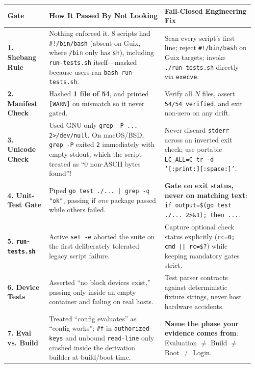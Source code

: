 \documentclass[11pt,oneside]{book}
\begin{document}
\begin{center}
\begin{tabularx}{\textwidth}{lXX}
\toprule
\textbf{Gate} & \textbf{How It Passed By Not Looking} & \textbf{Fail-Closed Engineering Fix} \\
\midrule
\textbf{1. Shebang Rule} & Nothing enforced it. 8 scripts had \texttt{\#!/bin/bash} (absent on Guix, where \texttt{/bin} only has \texttt{sh}), including \texttt{run-tests.sh} itself—masked because users ran \texttt{bash run-tests.sh}. & Scan every script's first line; reject \texttt{\#!/bin/bash} on Guix targets; invoke \texttt{./run-tests.sh} directly via \texttt{execve}. \\
\textbf{2. Manifest Check} & Hashed \textbf{1 file of 54}, and printed \texttt{[WARN]} on mismatch so it never gated. & Verify all $N$ files, assert \texttt{54/54 verified}, and exit non-zero on any drift. \\
\textbf{3. Unicode Check} & Used GNU-only \texttt{grep -P ... 2>/dev/null}. On macOS/BSD, \texttt{grep -P} exited \texttt{2} immediately with empty stdout, which the script treated as ``0 non-ASCII bytes found''! & Never discard \texttt{stderr} across an inverted exit check; use portable \texttt{LC\_ALL=C tr -d '[:print:][:space:]'}. \\
\textbf{4. Unit-Test Gate} & Piped \texttt{go test ./... | grep -q "ok"}, passing if \emph{one} package passed while others failed. & \textbf{Gate on exit status, never on matching text}: \texttt{if output=\$(go test ./... 2>\&1); then ...}. \\
\textbf{5. \texttt{run-tests.sh}} & Active \texttt{set -e} aborted the suite on the first deliberately tolerated legacy script failure. & Capture optional check status explicitly (\texttt{rc=0; cmd || rc=\$?}) while keeping mandatory gates strict. \\
\textbf{6. Device Tests} & Asserted ``no block devices exist,'' passing only inside an empty container and failing on real hosts. & Test parser contracts against deterministic fixture strings, never host hardware accidents. \\
\textbf{7. Eval vs. Build} & Treated ``config evaluates'' as ``config works''; \texttt{\#f} in \texttt{authorized-keys} and unbound \texttt{read-line} only crashed inside the derivation builder at build/boot time. & \textbf{Name the phase your evidence comes from}: Evaluation $\neq$ Build $\neq$ Boot $\neq$ Login. \\
\bottomrule
\end{tabularx}
\end{center}
\end{document}
